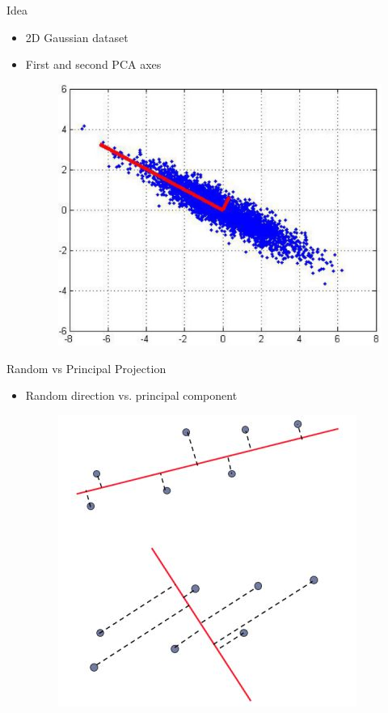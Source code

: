 \documentclass[serif, aspectratio=169]{beamer}
\begin{document}
\begin{frame}{Idea}
    \begin{itemize}
        \item 2D Gaussian dataset
        \item First and second PCA axes
         \begin{figure}[htpb]
            \begin{center}
                \includegraphics[keepaspectratio, scale=0.6]{pic/pcaData2.JPG}
            \end{center}
        \end{figure}
    \end{itemize}
\end{frame}

\begin{frame}{Random vs Principal Projection}
    \begin{itemize}
        \item Random direction vs. principal component
        \begin{figure}[htpb]
            \begin{center}
                \includegraphics[keepaspectratio, scale=0.8]{pic/pcaVSrandom.JPG}
            \end{center}
        \end{figure}
    \end{itemize}
\end{frame}
\end{document}
